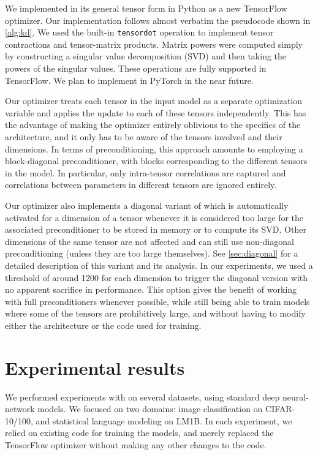 We implemented \NAME in its general tensor form in Python as a new
TensorFlow~\citep{tensorflow} optimizer. Our implementation follows almost
verbatim the pseudocode shown in \cref{alg:kd}.  We used the built-in
\texttt{tensordot} operation to implement tensor contractions and
tensor-matrix products. Matrix powers were computed simply by constructing a singular value decomposition (SVD) and then taking the powers of the singular values.  These operations are fully supported in TensorFlow. 
We plan to implement \NAME in PyTorch in the near future.

Our optimizer treats each tensor in the input model as a separate
optimization variable and applies the \NAME update to each of these tensors
independently. This has the advantage of making the optimizer entirely
oblivious to the specifics of the architecture, and it only has to be aware
of the tensors involved and their dimensions.  In terms of
preconditioning, this approach amounts to employing a block-diagonal
preconditioner, with blocks corresponding to the different tensors in the
model. In particular, only intra-tensor correlations are captured and
correlations between parameters in different tensors are ignored entirely.

Our optimizer also implements a diagonal variant of \NAME which is
automatically activated for a dimension of a tensor whenever it is
considered too large for the associated preconditioner to be stored in
memory or to compute its SVD. Other dimensions of the same tensor are not
affected and can still use non-diagonal preconditioning (unless they are too
large themselves). 
See \cref{sec:diagonal} for a detailed description of this variant and its analysis.
In our experiments, we used a threshold of around 1200 for each dimension to trigger the diagonal version with no apparent sacrifice in performance. This
option gives the benefit of working with full preconditioners whenever
possible, while still being able to train models where some of the tensors
are prohibitively large, and without having to modify either the architecture
or the code used for training.

\section{Experimental results}
\label{sec:experiments}

We performed experiments with \NAME on several datasets, using standard deep neural-network models.
We focused on two domains: image classification on CIFAR-10/100, and statistical language modeling on LM1B.
In each experiment, we relied on existing code for training the models, and merely replaced the TensorFlow optimizer without making any other changes to the code.

